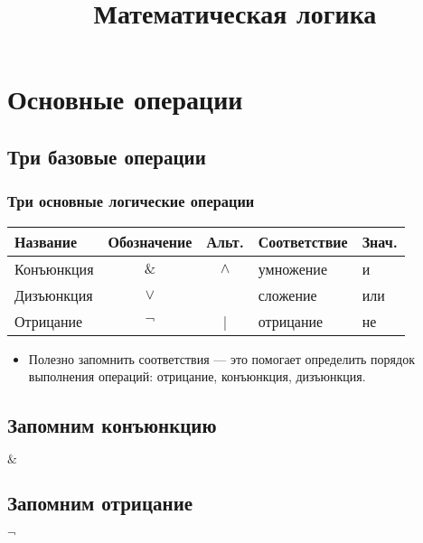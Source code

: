 \documentclass[compress,red]{beamer}
\title{Математическая логика}
\begin{document}
\maketitle

\section{Основные операции}

\subsection{Три базовые операции}
\begin{frame}[fragile]
  \frametitle{Три основные логические операции}
  
  \begin{tabular}{|l|c|c|l|l|}
    \hline
    Название & Обозначение  & Альт. & Соответствие & Знач. \\
    \hline
    Конъюнкция & $\&$ & $\wedge$ & умножение & и \\
    \hline
    Дизъюнкция & $\vee$ &  & сложение & или \\
    \hline
    Отрицание & $\neg$ & \bar{ } & отрицание & не \\
    \hline
  \end{tabular}
  
  \begin{itemize}
    \item Полезно запомнить соответствия --- это помогает определить порядок выполнения операций: отрицание, конъюнкция, дизъюнкция.
  \end{itemize}
\end{frame}

\subsection{Запомним конъюнкцию}
\begin{frame}
  \begin{center}
    \Huge{$\&$}
  \end{center}
\end{frame}

\subsection{Запомним отрицание}
\begin{frame}
  \begin{center}
    \Huge{$\neg$}
  \end{center}
\end{frame}
\end{document}

